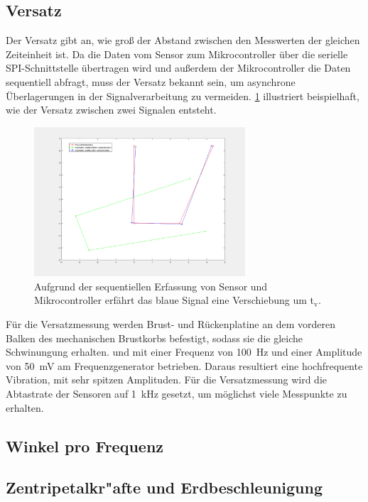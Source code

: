 	\subsection{Versatz}
	Der Versatz gibt an, wie groß der Abstand zwischen den Messwerten der gleichen Zeiteinheit ist. Da die Daten vom Sensor zum Mikrocontroller über die serielle SPI-Schnittstelle übertragen wird und außerdem der Mikrocontroller die Daten sequentiell abfragt, muss der Versatz bekannt sein, um asynchrone Überlagerungen in der Signalverarbeitung zu vermeiden. \ref{img:versatz} illustriert beispielhaft, wie der Versatz zwischen zwei Signalen entsteht.
	
	\begin{figure}[h]
		\centering
		\includegraphics[width=0.7\textwidth]{images/versatz.PNG}
		\caption[Versatz zwischen zwei Signalen]{Aufgrund der sequentiellen Erfassung von Sensor und Mikrocontroller erfährt das blaue Signal eine Verschiebung um t$_\text{v}$.}
		\label{img:versatz}
	\end{figure}

	Für die Versatzmessung werden Brust- und Rückenplatine an dem vorderen Balken des mechanischen Brustkorbs befestigt, sodass sie die gleiche Schwinungung erhalten. und mit einer Frequenz von 100~Hz und einer Amplitude von 50~mV am Frequenzgenerator betrieben. Daraus resultiert eine hochfrequente Vibration, mit sehr spitzen Amplituden. Für die Versatzmessung wird die Abtastrate der Sensoren auf 1~kHz gesetzt, um möglichst viele Messpunkte zu erhalten.
	
	\subsection{Winkel pro Frequenz}
	
	\subsection{Zentripetalkr"afte und Erdbeschleunigung}
	
